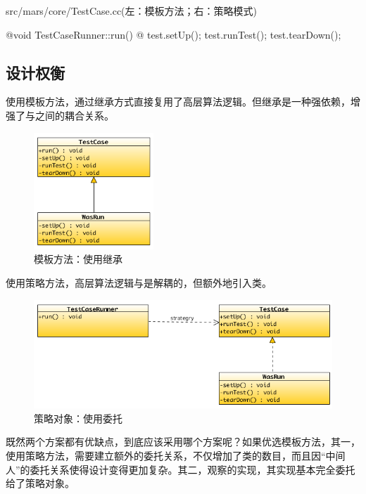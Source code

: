 \begin{content}
\begin{diff}{src/mars/core/TestCase.cc(左：模板方法；右：策略模式)}
\begin{minicpp}
@void TestCaseRunner::run() {@
  test.setUp();
  test.runTest();
  test.tearDown();
}
\end{minicpp} 
\end{diff}

\subsection{设计权衡}

使用模板方法，通过继承方式直接复用了高层算法逻辑。但继承是一种强依赖，增强了与之间的耦合关系。

\begin{figure}[H]
\centering
\includegraphics[width=0.4\textwidth]{figures/xunit/simple-test.png}
\caption{模板方法：使用继承}
 \label{fig:simple-test}
\end{figure}

使用策略方法，高层算法逻辑与是解耦的，但额外地引入类。

\begin{figure}[H]
\centering
\includegraphics[width=1.0\textwidth]{figures/xunit/simple-test-strategry.png}
\caption{策略对象：使用委托}
 \label{fig:simple-test-strategry}
\end{figure}

既然两个方案都有优缺点，到底应该采用哪个方案呢？如果优选模板方法，其一，使用策略方法，需要建立额外的委托关系，不仅增加了类的数目，而且因“中间人”的委托关系使得设计变得更加复杂。其二，观察的实现，其实现基本完全委托给了策略对象。


\end{content}

